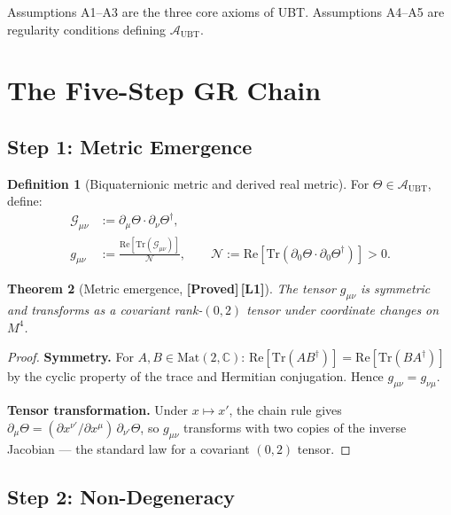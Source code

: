 \documentclass[12pt,a4paper]{article}
\newtheorem{theorem}{Theorem}[section]
\theoremstyle{definition}
\newtheorem{definition}[theorem]{Definition}
\theoremstyle{remark}
\newcommand{\PROVED}{\textbf{[Proved]}}
\newcommand{\Lone}{\textbf{[L1]}}
\newcommand{\CC}{\mathbb{C}}
\newcommand{\Tr}{\mathrm{Tr}}
\newcommand{\re}{\mathrm{Re}}
\newcommand{\calA}{\mathcal{A}}
\newcommand{\calG}{\mathcal{G}}
\newcommand{\calN}{\mathcal{N}}
\begin{document}
Assumptions A1--A3 are the three core axioms of UBT.
Assumptions A4--A5 are regularity conditions defining $\calA_{\mathrm{UBT}}$.

\section{The Five-Step GR Chain}
\label{sec:chain}

\subsection{Step 1: Metric Emergence}
\label{sec:step1}

\begin{definition}[Biquaternionic metric and derived real metric]
\label{def:metric}
For $\Theta \in \calA_{\mathrm{UBT}}$, define:
\begin{align}
  \calG_{\mu\nu} &:= \partial_\mu\Theta \cdot \partial_\nu\Theta^\dagger, \\
  g_{\mu\nu} &:= \frac{\re[\Tr(\calG_{\mu\nu})]}{\calN},
  \qquad
  \calN := \re[\Tr(\partial_0\Theta \cdot \partial_0\Theta^\dagger)] > 0.
\end{align}
\end{definition}

\begin{theorem}[Metric emergence, \PROVED\,\Lone]
\label{thm:metric}
The tensor $g_{\mu\nu}$ is symmetric and transforms as a covariant
rank-$(0,2)$ tensor under coordinate changes on $M^4$.
\end{theorem}

\begin{proof}
\textbf{Symmetry.}
For $A,B \in \mathrm{Mat}(2,\CC)$:
$\re[\Tr(AB^\dagger)] = \re[\Tr(BA^\dagger)]$
by the cyclic property of the trace and Hermitian conjugation.
Hence $g_{\mu\nu} = g_{\nu\mu}$.

\textbf{Tensor transformation.}
Under $x \mapsto x'$, the chain rule gives
$\partial_\mu\Theta = (\partial x^{\nu'}/\partial x^\mu)\,\partial_{\nu'}\Theta$,
so $g_{\mu\nu}$ transforms with two copies of the inverse Jacobian ---
the standard law for a covariant $(0,2)$ tensor.
\end{proof}

\subsection{Step 2: Non-Degeneracy}
\label{sec:step2}
\end{document}

